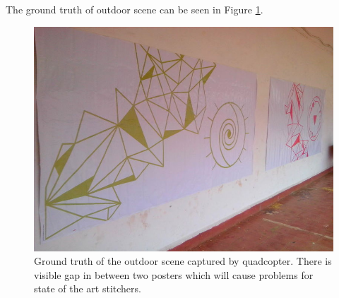 The ground truth of outdoor scene can be seen in Figure
\ref{fig:green_red_groundtruth}.

\begin{figure}
\includegraphics[width=\linewidth]{figures/green_red/groundtruth.jpg}
\caption{Ground truth of the outdoor scene captured by quadcopter. There is
visible gap in between two posters which will cause problems for state of the art
stitchers.}
\label{fig:green_red_groundtruth}
\end{figure}


